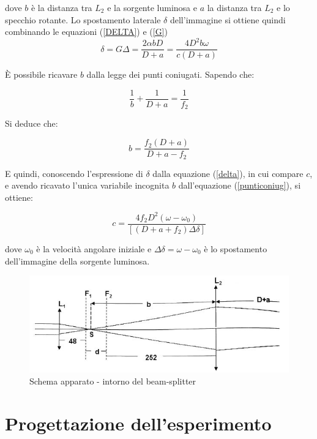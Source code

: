 \documentclass{article}
\begin{document}
dove $b$ è la distanza tra $L_2$ e la sorgente luminosa e $a$  la distanza tra $L_2$ e lo specchio rotante. Lo spostamento laterale $\delta$ dell'immagine si ottiene quindi
combinando le equazioni (\ref{DELTA}) e (\ref{G})
\begin{equation}
\delta = G\Delta =\frac{2\alpha b D}{D + a}=\frac{4 D^2 b \omega}{c(D+a)}
\label{delta}
\end{equation}

È possibile ricavare $b$ dalla legge dei punti coniugati. Sapendo che:

\begin{equation}
\frac{1}{b}+\frac{1}{D+a}=\frac{1}{f_2}
\label{punticoniug}
\end{equation}

Si deduce che:

\begin{equation}
b=\frac{f_2(D+a)}{D+a-f_2}
\end{equation}

E quindi, conoscendo l'espressione di $\delta$ dalla equazione (\ref{delta}), in cui compare $c$, e avendo ricavato l'unica variabile incognita $b$ dall'equazione
(\ref{punticoniug}), si ottiene:

\begin{equation}
c = \frac{4f_2D^2(\omega-\omega_0)}{[(D+a+f_2)\Delta\delta]}
\end{equation}

dove $\omega_0$ è la velocità angolare iniziale e $\Delta\delta = \omega - \omega_0$ è lo spostamento dell'immagine della sorgente luminosa.

\begin{figure}[h]
    \centering
        \includegraphics[width=0.6\linewidth]{IntroTeorica1.JPG}
    \caption{Schema apparato - intorno del beam-splitter}
\end{figure}


\newpage

\section{Progettazione dell'esperimento}
\end{document}
